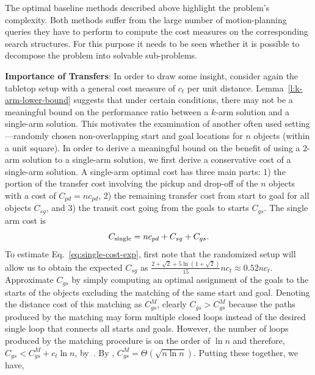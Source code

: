 
The optimal baseline methods described above highlight the problem's complexity. Both methods suffer from the large number of motion-planning queries they have to perform to compute the cost measures on the corresponding search structures. For this purpose it needs to be seen whether it is possible to decompose the problem into solvable sub-problems. 

\noindent\textbf{Importance of Transfers}: In order to draw some insight, consider again the tabletop setup with a general cost measure of $c_t$ per unit distance.
Lemma~\ref{l:k-arm-lower-bound} suggests that under certain conditions, there 
may not be a meaningful bound on the performance ratio between a $k$-arm 
solution and a single-arm solution. This motivates the examination of another
often used setting---randomly chosen non-overlapping 
start and goal locations for $n$ objects (within a unit square). In order to derive a 
meaningful bound on the benefit of using a $2$-arm solution 
to a single-arm solution, we first derive a conservative cost of a single-arm solution. 
A single-arm optimal cost has three main parts: 1) the portion of the transfer cost involving the pickup and 
drop-off of the $n$ objects with a cost of $C_{pd} = nc_{pd}$, 2) the remaining transfer cost from 
start to goal for all objects $C_{sg}$, and 3) the transit cost 
going from the goals to starts $C_{gs}$. The single arm cost is  
\begin{equation}
\label{eq:single-cost-exp}
C_{\rm single} = nc_{pd} + C_{sg} + C_{gs}.
\end{equation}
To estimate Eq.~\ref{eq:single-cost-exp}, first note that the randomized setup 
will allow us to obtain the expected $C_{sg}$\cite{santalo2004integral} as
$\frac{2 + \sqrt{2} + 5\ln(1+\sqrt{2})}{15}nc_t \approx 0.52nc_t$.
Approximate $C_{gs}$ by simply computing an optimal assignment of the 
goals to the starts of the objects excluding the matching of the same start 
and goal. Denoting the distance cost of this matching as $C_{gs}^M$, clearly
$C_{gs} > C_{gs}^M$ because the paths produced by the matching may form 
multiple closed loops instead of the desired single loop that connects all 
starts and goals. However, the number of loops produced by the matching 
procedure is on the order of $\ln n$ and therefore, $C_{gs} < C_{gs}^M + 
c_t\ln n$, by~\cite{TrePavFra13}. By \cite{AjtKomTus84}, 
$C_{gs}^M = \Theta(\sqrt{n\ln n})$. Putting these together, we have,

